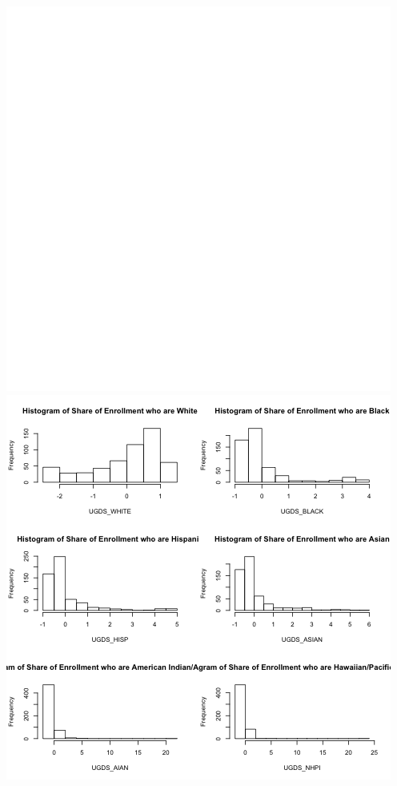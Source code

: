 \includegraphics{../../images/histogram_majors.png}
\includegraphics{../../images/histogram_race_enrollment.png}
